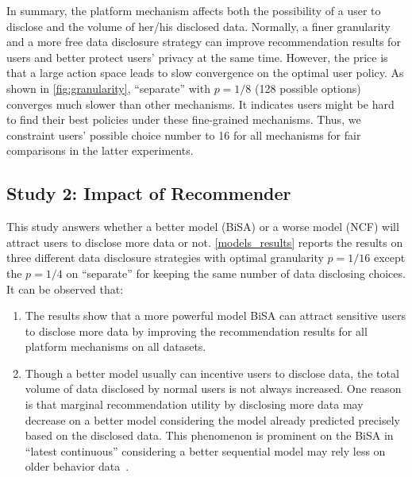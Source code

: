 In summary, the platform mechanism affects both the possibility of a user to disclose and the volume of her/his disclosed data. 
Normally, a finer granularity and a more free data disclosure strategy can improve recommendation results for users and better protect users' privacy at the same time. 
However, the price is that a large action space leads to slow convergence on the optimal user policy. 
As shown in \cref{fig:granularity}, ``separate'' with $p{=}1/8$ (128 possible options) converges much slower than other mechanisms.
It indicates users might be hard to find their best policies under these fine-grained mechanisms.
Thus, we constraint users' possible choice number to 16 for all mechanisms for fair comparisons in the latter experiments.













\subsection{Study 2: Impact of Recommender}


This study answers whether a better model (BiSA) or a worse model (NCF) will attract users to disclose more data or not. 
\cref{models_results} reports the results on three different data disclosure strategies with optimal granularity $p=1/16$ except the $p=1/4$ on ``separate'' for keeping the same number of data disclosing choices. 
It can be observed that:

\begin{enumerate}
    \item The results show that a more powerful model BiSA can attract sensitive users to disclose more data by improving the recommendation results for all platform mechanisms on all datasets.
    \item Though a better model usually can incentive users to disclose data, the total volume of data disclosed by normal users is not always increased. 
One reason is that marginal recommendation utility by disclosing more data may decrease on a better model considering the model already predicted precisely based on the disclosed data.
This phenomenon is prominent on the BiSA in ``latest continuous'' considering a better sequential model may rely less on older behavior data~\cite{kang2018self,Sun:cikm19:BERT4Rec}.
\end{enumerate}






